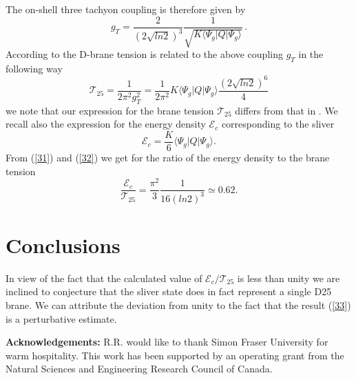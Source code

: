 \documentclass[a4paper,12pt]{article}
\begin{document}
The on-shell three tachyon coupling is therefore given by
\begin{equation}
g_T=\frac{2}{(2\sqrt{ln2})^3}\frac{1}
{\sqrt{K\langle\Psi_g|Q|\Psi_g\rangle}}\, .
\label{30}
\end{equation}
According to \cite{s,gs} the D-brane tension is related to the above coupling
$g_T$ in the following way
\begin{equation}
{\mathcal T_{25}}=\frac{1}{2\pi^2 g_T^2}=
\frac{1}{2\pi^2}K\langle\Psi_g|Q|\Psi_g\rangle
\frac{(2\sqrt{ln2})^6}{4}
\label{31}
\end{equation}
we note that our expression for the brane tension ${\mathcal T}_{25}$
differs
from that in \cite{rsz1}. We recall also the expression for the energy density
${\mathcal E}_c$ corresponding to the sliver
\begin{equation}
{\mathcal E}_c=\frac K6\langle\Psi_g|Q|\Psi_g\rangle .
\label{32}
\end{equation}
From (\ref{31}) and (\ref{32}) we get for the ratio of the energy density
 to the brane tension
\begin{equation}
\frac{
{\mathcal E}_c}
{
{\mathcal T}_{25}} =\frac{\pi^2}{3}\frac{1}{16(ln2)^3}
\simeq 0.62.
\label{33}
\end{equation}

\vspace*{.8cm}

\section{Conclusions}

In view of the fact that the calculated value of
$\mathcal{E}_c/\mathcal{T}_{25}$
is less than unity we are inclined to conjecture that the sliver state
does in fact represent a single D25 brane. We can attribute the deviation
from unity to the fact that the result (\ref{33})
is a perturbative estimate.

\vspace*{.8cm}

{\bf Acknowledgements:}  R.R. would like to thank Simon Fraser
University for warm hospitality. This work has been supported by an
operating grant from the Natural Sciences and Engineering Research Council
of Canada.

\vspace*{.8cm}
\end{document}
